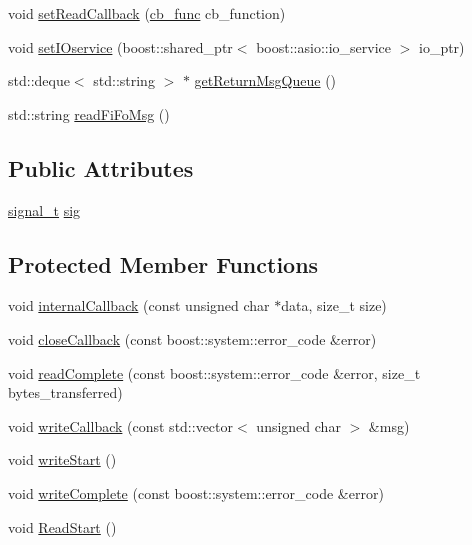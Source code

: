 \begin{DoxyCompactItemize}
void \hyperlink{classo_cpt_1_1protocol_1_1_serial_ab86f007388ac73b97fdbf14921bc1e32}{set\+Read\+Callback} (\hyperlink{classo_cpt_1_1protocol_1_1_serial_ad55591180be8bea2fe3832b1265b7496}{cb\+\_\+func} cb\+\_\+function)
\item 
void \hyperlink{classo_cpt_1_1protocol_1_1_serial_abddd54f13b696af1ca6ac0f97950708b}{set\+I\+Oservice} (boost\+::shared\+\_\+ptr$<$ boost\+::asio\+::io\+\_\+service $>$ io\+\_\+ptr)
\item 
std\+::deque$<$ std\+::string $>$ $\ast$ \hyperlink{classo_cpt_1_1protocol_1_1_serial_ad1c50382b0f52828b3111f4dc2f03bad}{get\+Return\+Msg\+Queue} ()
\item 
std\+::string \hyperlink{classo_cpt_1_1protocol_1_1_serial_a34fd0ec3f90b067eb7f749f39986d31d}{read\+Fi\+Fo\+Msg} ()
\end{DoxyCompactItemize}
\subsection*{Public Attributes}
\begin{DoxyCompactItemize}
\item 
\hyperlink{classo_cpt_1_1protocol_1_1_serial_ad6b50eec67a064c4a2eb34d3ac605ffb}{signal\+\_\+t} \hyperlink{classo_cpt_1_1protocol_1_1_serial_a363071a4e7ead980f7f3369f57acf578}{sig}
\end{DoxyCompactItemize}
\subsection*{Protected Member Functions}
\begin{DoxyCompactItemize}
\item 
void \hyperlink{classo_cpt_1_1protocol_1_1_serial_adb32d1835a99365baa9fb97689e0b664}{internal\+Callback} (const unsigned char $\ast$data, size\+\_\+t size)
\item 
void \hyperlink{classo_cpt_1_1protocol_1_1_serial_a3abae181678a125e420092465d063526}{close\+Callback} (const boost\+::system\+::error\+\_\+code \&error)
\item 
void \hyperlink{classo_cpt_1_1protocol_1_1_serial_ac7d84ba0853d120852157c490bdcd097}{read\+Complete} (const boost\+::system\+::error\+\_\+code \&error, size\+\_\+t bytes\+\_\+transferred)
\item 
void \hyperlink{classo_cpt_1_1protocol_1_1_serial_a02f091d3e3333bc1f723216cbeb757af}{write\+Callback} (const std\+::vector$<$ unsigned char $>$ \&msg)
\item 
void \hyperlink{classo_cpt_1_1protocol_1_1_serial_a1fedc27e16c383de81e5a05fee742581}{write\+Start} ()
\item 
void \hyperlink{classo_cpt_1_1protocol_1_1_serial_a8b1037a2eefdd4215f1d4732e168272c}{write\+Complete} (const boost\+::system\+::error\+\_\+code \&error)
\item 
void \hyperlink{classo_cpt_1_1protocol_1_1_serial_a5bf4aa913654c4ebef3c48ec54cf8b03}{Read\+Start} ()
\end{DoxyCompactItemize}
